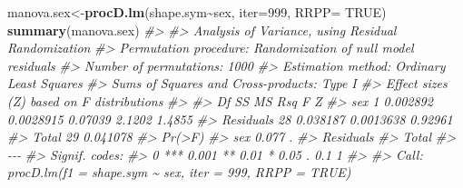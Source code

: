 \documentclass[
]{book}
\newenvironment{Shaded}{\begin{snugshade}}{\end{snugshade}}
\newcommand{\AttributeTok}[1]{\textcolor[rgb]{0.13,0.29,0.53}{#1}}
\newcommand{\CommentTok}[1]{\textcolor[rgb]{0.56,0.35,0.01}{\textit{#1}}}
\newcommand{\ConstantTok}[1]{\textcolor[rgb]{0.56,0.35,0.01}{#1}}
\newcommand{\DecValTok}[1]{\textcolor[rgb]{0.00,0.00,0.81}{#1}}
\newcommand{\FunctionTok}[1]{\textcolor[rgb]{0.13,0.29,0.53}{\textbf{#1}}}
\newcommand{\NormalTok}[1]{#1}
\newcommand{\OtherTok}[1]{\textcolor[rgb]{0.56,0.35,0.01}{#1}}
\newcommand{\SpecialCharTok}[1]{\textcolor[rgb]{0.81,0.36,0.00}{\textbf{#1}}}
\begin{document}
\begin{Shaded}
\begin{Highlighting}[]
\NormalTok{manova.sex}\OtherTok{\textless{}{-}}\FunctionTok{procD.lm}\NormalTok{(shape.sym}\SpecialCharTok{\textasciitilde{}}\NormalTok{sex, }\AttributeTok{iter=}\DecValTok{999}\NormalTok{, }\AttributeTok{RRPP=} \ConstantTok{TRUE}\NormalTok{)}
\FunctionTok{summary}\NormalTok{(manova.sex)}
\CommentTok{\#\textgreater{} }
\CommentTok{\#\textgreater{} Analysis of Variance, using Residual Randomization}
\CommentTok{\#\textgreater{} Permutation procedure: Randomization of null model residuals }
\CommentTok{\#\textgreater{} Number of permutations: 1000 }
\CommentTok{\#\textgreater{} Estimation method: Ordinary Least Squares }
\CommentTok{\#\textgreater{} Sums of Squares and Cross{-}products: Type I }
\CommentTok{\#\textgreater{} Effect sizes (Z) based on F distributions}
\CommentTok{\#\textgreater{} }
\CommentTok{\#\textgreater{}           Df       SS        MS     Rsq      F      Z}
\CommentTok{\#\textgreater{} sex        1 0.002892 0.0028915 0.07039 2.1202 1.4855}
\CommentTok{\#\textgreater{} Residuals 28 0.038187 0.0013638 0.92961              }
\CommentTok{\#\textgreater{} Total     29 0.041078                                }
\CommentTok{\#\textgreater{}           Pr(\textgreater{}F)  }
\CommentTok{\#\textgreater{} sex        0.077 .}
\CommentTok{\#\textgreater{} Residuals         }
\CommentTok{\#\textgreater{} Total             }
\CommentTok{\#\textgreater{} {-}{-}{-}}
\CommentTok{\#\textgreater{} Signif. codes:  }
\CommentTok{\#\textgreater{} 0 \textquotesingle{}***\textquotesingle{} 0.001 \textquotesingle{}**\textquotesingle{} 0.01 \textquotesingle{}*\textquotesingle{} 0.05 \textquotesingle{}.\textquotesingle{} 0.1 \textquotesingle{} \textquotesingle{} 1}
\CommentTok{\#\textgreater{} }
\CommentTok{\#\textgreater{} Call: procD.lm(f1 = shape.sym \textasciitilde{} sex, iter = 999, RRPP = TRUE)}


\end{Highlighting}
\end{Shaded}
\end{document}
